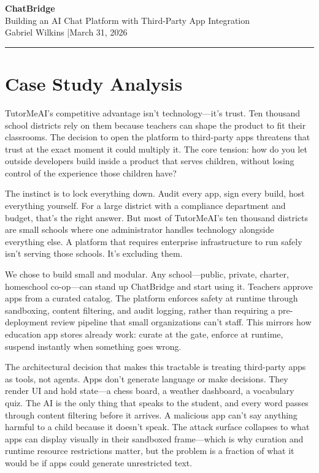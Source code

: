 \documentclass[11pt,letterpaper]{article}
\begin{document}
\begin{center}
{\LARGE\bfseries\color{cbblue} ChatBridge}\\[4pt]
{\large Building an AI Chat Platform with Third-Party App Integration}\\[6pt]
{\normalsize Gabriel Wilkins \quad|\quad March 31, 2026}
\end{center}

\vspace{0.5em}
\noindent\rule{\textwidth}{0.5pt}
\vspace{0.5em}

\section*{Case Study Analysis}

TutorMeAI's competitive advantage isn't technology---it's trust. Ten thousand school
districts rely on them because teachers can shape the product to fit their classrooms.
The decision to open the platform to third-party apps threatens that trust at the exact
moment it could multiply it. The core tension: how do you let outside developers build
inside a product that serves children, without losing control of the experience those
children have?

The instinct is to lock everything down. Audit every app, sign every build, host
everything yourself. For a large district with a compliance department and budget,
that's the right answer. But most of TutorMeAI's ten thousand districts are small
schools where one administrator handles technology alongside everything else. A platform
that requires enterprise infrastructure to run safely isn't serving those schools. It's
excluding them.

We chose to build small and modular. Any school---public, private, charter, homeschool
co-op---can stand up ChatBridge and start using it. Teachers approve apps from a curated
catalog. The platform enforces safety at runtime through sandboxing, content filtering,
and audit logging, rather than requiring a pre-deployment review pipeline that small
organizations can't staff. This mirrors how education app stores already work: curate
at the gate, enforce at runtime, suspend instantly when something goes wrong.

The architectural decision that makes this tractable is treating third-party apps as
tools, not agents. Apps don't generate language or make decisions. They render UI and
hold state---a chess board, a weather dashboard, a vocabulary quiz. The AI is the only
thing that speaks to the student, and every word passes through content filtering before
it arrives. A malicious app can't say anything harmful to a child because it doesn't
speak. The attack surface collapses to what apps can display visually in their sandboxed
frame---which is why curation and runtime resource restrictions matter, but the problem
is a fraction of what it would be if apps could generate unrestricted text.
\end{document}
